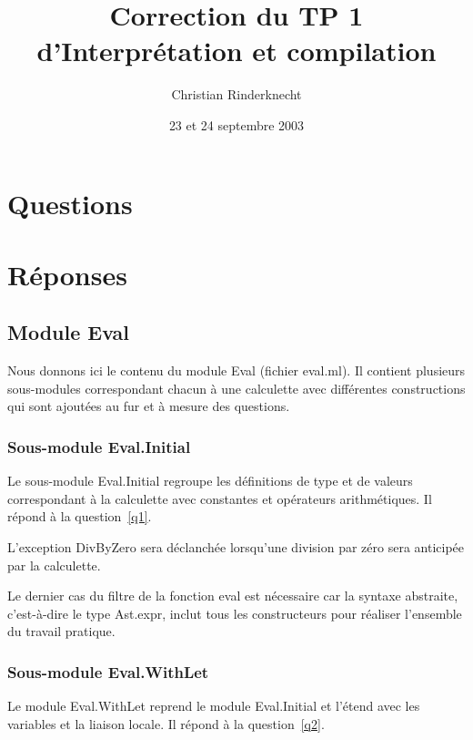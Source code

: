 \documentclass[a4paper,11pt]{article}
\title{Correction du TP 1 d'Interprétation et compilation}
\author{Christian Rinderknecht}
\date{23 et 24 septembre 2003}
\begin{document}
\maketitle

\section{Questions}



\section{Réponses}

\subsection{Module \textsf{Eval}}

Nous donnons ici le contenu du module \textsf{Eval} (fichier
\textsf{eval.ml}). Il contient plusieurs sous-modules correspondant
chacun à une calculette avec différen\-tes constructions qui sont
ajoutées au fur et à mesure des questions.



\subsubsection{Sous-module \textsf{Eval.Initial}}
\label{Eval.Initial}

Le sous-module \textsf{Eval.Initial} regroupe les définitions de type
et de valeurs correspondant à la calculette avec constantes et
opérateurs arithmétiques. Il répond à la question~\ref{q1}.

L'exception \textsf{DivByZero} sera déclanchée lorsqu'une division par
zéro sera anticipée par la calculette.

Le dernier cas du filtre de la fonction \textsf{eval} est nécessaire car la
syntaxe abstraite, c'est-à-dire le type \textsf{Ast.expr}, inclut tous les
constructeurs pour réaliser l'ensemble du travail pratique.

\subsubsection{Sous-module \textsf{Eval.WithLet}}
\label{Eval.WithLet}

Le module \textsf{Eval.WithLet} reprend le module
\textsf{Eval.Initial} et l'étend avec les variables et la liaison
locale. Il répond à la question~\ref{q2}.
\end{document}
